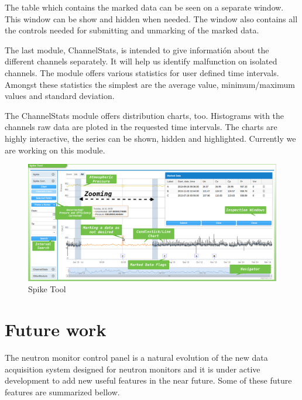 \documentclass[a4paper]{jpconf}
\begin{document}
The table which contains the marked data can be seen on a separate window. This
window can be show and hidden when needed. The window also contains all the
controls needed for submitting and unmarking of the marked data.

The last module, ChannelStats, is intended to give informatión about the
different channels separately. It will help us identify malfunction on isolated
channels. The module offers various statistics for user defined time intervals.
Amongst these statistics the simplest are the average value, minimum/maximum
values and standard deviation.

The ChannelStats module offers distribution charts, too. Histograms with the
channels raw data are ploted in the requested time intervals. The charts are
highly interactive, the series can be shown, hidden and highlighted. Currently
we are working on this module.

\begin{figure}[h]
    \centering
    \includegraphics[keepaspectratio, width=1\textwidth]{./resources/SpikeTool.png}
    \caption{Spike Tool}
    \label{fig:tool}
\end{figure}

\section{Future work}

The neutron monitor control panel is a natural evolution of the new data
acquisition system designed for neutron monitors and it is under active
development to add new useful features in the near future. Some of these future
features are summarized bellow.
\end{document}
